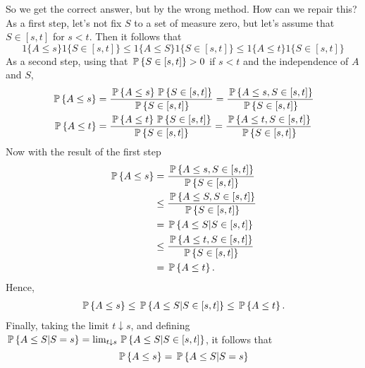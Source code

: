 \begin{question}
\begin{solution}
So we get the correct answer, but by the wrong method.  How can we
repair this?  As a first step, let's not fix $S$ to a set of measure
zero, but let's assume that $S\in [s,t]$ for $s<t$. Then it follows
that
\begin{equation*}
  1\{A\leq s\} 1\{S\in[s,t]\} \leq  1\{A\leq S\} 1\{S\in[s,t]\} \leq 1\{A\leq t\} 1\{S\in[s,t]\}
\end{equation*}
As a second step,  using that $\P{S\in[s,t]} > 0$ if $s<t$ and the independence of $A$ and $S$,
\begin{equation*}
  \begin{split}
    \P{A\leq s} &= \frac{\P{A\leq s} \P{S\in[s,t]}}{\P{S\in[s,t]}} = \frac{\P{A\leq s,  S\in[s,t]}}{\P{S\in[s,t]}} \\
    \P{A\leq t} &= \frac{\P{A\leq t} \P{S\in[s,t]}}{\P{S\in[s,t]}} = \frac{\P{A\leq t,  S\in[s,t]}}{\P{S\in[s,t]}}
  \end{split}
\end{equation*}
Now with the result of the first step
\begin{equation*}
  \begin{split}
    \P{A\leq s} 
&= \frac{\P{A\leq s,  S\in[s,t]}}{\P{S\in[s,t]}} \\
&\leq \frac{\P{A\leq S,  S\in[s,t]}}{\P{S\in[s,t]}} \\
&= \P{A\leq S| S\in[s,t]} \\
&\leq \frac{\P{A\leq t,  S\in[s,t]}}{\P{S\in[s,t]}} \\
&= \P{A\leq t}.
  \end{split}
\end{equation*}
Hence, 
\begin{equation*}
  \begin{split}
    \P{A\leq s} \leq \P{A\leq S| S\in[s,t]} \leq \P{A\leq t}.
  \end{split}
\end{equation*}
Finally, taking the limit $t\downarrow s$, and defining $\P{A\leq S|
S = s} = \lim_{t\downarrow s} \P{A\leq S| S\in[s,t]}$, it follows
that
\begin{equation*}
    \P{A\leq s} = \P{A\leq S| S = s}
\end{equation*}


\end{solution}
\end{question}
